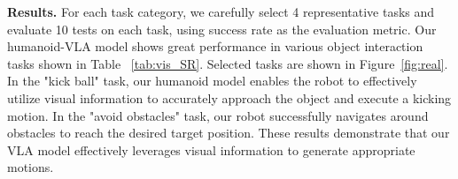 \textbf{Results.}
For each task category, we carefully select 4 representative tasks and evaluate 10 tests on each task, using success rate as the evaluation metric.
Our humanoid-VLA model shows great performance in various object interaction tasks shown in Table ~\ref{tab:vis_SR}.
Selected tasks are shown in Figure~\ref{fig:real}. 
In the "kick ball" task, our humanoid model enables the robot to effectively utilize visual information to accurately approach the object and execute a kicking motion. 
In the "avoid obstacles" task, our robot successfully navigates around obstacles to reach the desired target position. 
These results demonstrate that our VLA model effectively leverages visual information to generate appropriate motions.





\begin{table}[ht]
  \centering
  \caption{\textbf{Evaluation on Vision Integration.} }
  \label{tab:vis_SR}
  \vspace{-2em}
\end{table}











